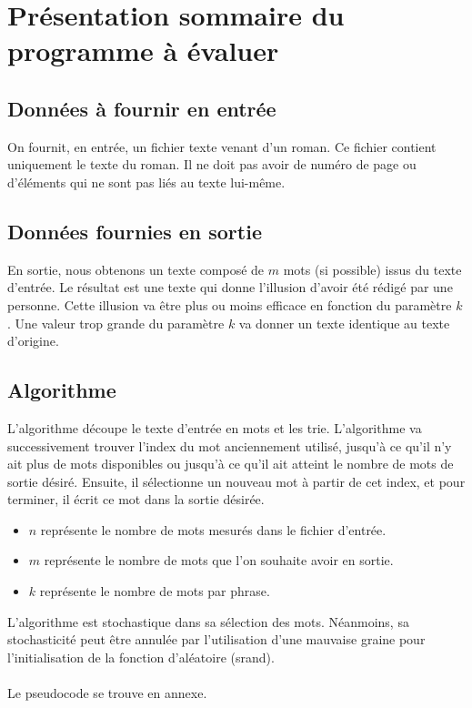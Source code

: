 
\section{Présentation sommaire du programme à évaluer}

\subsection{Données à fournir en entrée}

On fournit, en entrée, un fichier texte venant d'un roman.
Ce fichier contient uniquement le texte du roman. Il ne doit pas avoir de numéro de page ou d'éléments qui ne sont pas liés au texte lui-même.

\subsection{Données fournies en sortie}

En sortie, nous obtenons un texte composé de $m$ mots (si possible) issus du texte d'entrée.
Le résultat est une texte qui donne l'illusion d'avoir été rédigé par une personne.
Cette illusion va être plus ou moins efficace en fonction du paramètre $k$.
Une valeur trop grande du paramètre $k$ va donner un texte identique au texte d'origine.

\subsection{Algorithme}


L'algorithme découpe le texte d'entrée en mots et les trie.
L'algorithme va successivement trouver l'index du mot anciennement utilisé, jusqu'à ce qu'il n'y ait plus de mots disponibles ou jusqu'à ce qu'il ait atteint le nombre de mots de sortie désiré. Ensuite, il sélectionne un nouveau mot à partir de cet index, et pour terminer, il écrit ce mot dans la sortie désirée.


\begin{itemize}
	\item $n$ représente le nombre de mots mesurés dans le fichier d'entrée.
	\item $m$ représente le nombre de mots que l'on souhaite avoir en sortie.
	\item $k$ représente le nombre de mots par phrase.
\end{itemize}

L'algorithme est stochastique dans sa sélection des mots. Néanmoins, sa stochasticité peut être annulée par l'utilisation d'une mauvaise graine pour l'initialisation de la fonction d'aléatoire (srand).
\\ \\
Le pseudocode se trouve en annexe.